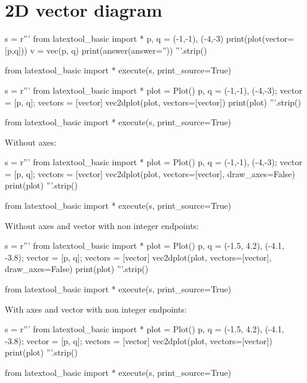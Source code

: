 \section{2D vector diagram}

\begin{python}
s = r'''
from latextool_basic import *
p, q = (-1,-1), (-4,-3)
print(plot(vector=[p,q]))
v = vec(p, q)
print(answer(answer=''))
'''.strip()

from latextool_basic import *
execute(s, print_source=True)
\end{python}

\begin{python}
s = r'''
from latextool_basic import *
plot = Plot()
p, q = (-1,-1), (-4,-3); vector = [p, q]; vectors = [vector]
vec2dplot(plot, vectors=[vector])
print(plot)
'''.strip()

from latextool_basic import *
execute(s, print_source=True)
\end{python}

Without axes:
\begin{python}
s = r'''
from latextool_basic import *
plot = Plot()
p, q = (-1,-1), (-4,-3); vector = [p, q]; vectors = [vector]
vec2dplot(plot, vectors=[vector], draw_axes=False)
print(plot)
'''.strip()

from latextool_basic import *
execute(s, print_source=True)
\end{python}

\newpage
Without axes and vector with non integer endpoints:
\begin{python}
s = r'''
from latextool_basic import *
plot = Plot()
p, q = (-1.5, 4.2), (-4.1, -3.8); vector = [p, q]; vectors = [vector]
vec2dplot(plot, vectors=[vector], draw_axes=False)
print(plot)
'''.strip()

from latextool_basic import *
execute(s, print_source=True)
\end{python}


\newpage
With axes and vector with non integer endpoints:
\begin{python}
s = r'''
from latextool_basic import *
plot = Plot()
p, q = (-1.5, 4.2), (-4.1, -3.8); vector = [p, q]; vectors = [vector]
vec2dplot(plot, vectors=[vector])
print(plot)
'''.strip()

from latextool_basic import *
execute(s, print_source=True)
\end{python}
